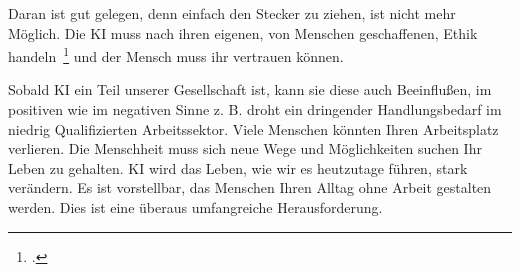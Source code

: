 Daran ist gut gelegen, denn einfach den Stecker zu ziehen, ist nicht mehr Möglich. Die \ac{KI} muss nach ihren eigenen, von Menschen geschaffenen, 
Ethik handeln~\footcite[\vglf][]{Wittpahl.2018} und der Mensch muss ihr vertrauen können.


Sobald \ac{KI} ein Teil unserer Gesellschaft ist, kann sie diese auch Beeinflußen, im positiven wie im negativen Sinne z. B. droht ein dringender Handlungsbedarf
im niedrig Qualifizierten Arbeitssektor. Viele Menschen könnten Ihren Arbeitsplatz verlieren. Die Menschheit muss sich neue Wege und Möglichkeiten suchen Ihr Leben zu 
gehalten. \ac{KI} wird das Leben, wie wir es heutzutage führen, stark verändern. Es ist vorstellbar, das Menschen Ihren Alltag ohne Arbeit gestalten werden. Dies ist eine
überaus umfangreiche Herausforderung.

